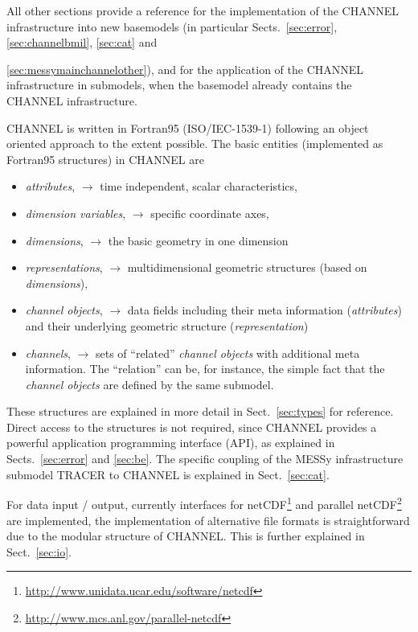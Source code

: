\documentclass[twoside]{article}
\begin{document}
All other sections provide a reference for the
implementation of the CHANNEL infrastructure into new basemodels
(in particular Sects.~\ref{sec:error}, \ref{sec:channelbmil},
\ref{sec:cat} and {\ref{sec:messymainchannelother}),
and for the application of the CHANNEL infrastructure in submodels, when the
basemodel already contains the CHANNEL infrastructure.

CHANNEL is written in Fortran95 (ISO/IEC-1539-1) following an object oriented
approach to the extent possible. The basic entities (implemented as Fortran95
structures) in CHANNEL are
\begin{itemize}
 \item {\it attributes}, $\rightarrow$ time independent, scalar
       characteristics,
 \item {\it dimension variables}, $\rightarrow$ specific coordinate axes,
 \item {\it dimensions}, $\rightarrow$ the basic geometry in one dimension
 \item {\it representations}, $\rightarrow$ multidimensional geometric
       structures (based on {\it dimensions}),
 \item {\it channel objects}, $\rightarrow$ data fields including their meta
       information ({\it attributes}) and their underlying geometric
       structure ({\it representation})
 \item {\it channels}, $\rightarrow$ sets of ``related''
       {\it channel objects} with additional meta information.
       The ``relation'' can be, for instance, the simple fact that the
       {\it channel objects} are defined by the same submodel.
\end{itemize}
%
These structures are explained in more detail in Sect.~\ref{sec:types} for
reference. Direct access to the structures is not required, since
CHANNEL provides a powerful application programming interface (API),
as explained in Sects.~\ref{sec:error} and \ref{sec:be}.
The specific coupling of the MESSy infrastructure submodel TRACER to
CHANNEL is explained in Sect.~\ref{sec:cat}.

For data input / output,
currently interfaces for
netCDF\footnote{\url{http://www.unidata.ucar.edu/software/netcdf}}
and
parallel netCDF\footnote{\url{http://www.mcs.anl.gov/parallel-netcdf}}
are implemented, the implementation of
alternative file formats is straightforward due to the modular
structure of CHANNEL.
This is further explained in Sect.~\ref{sec:io}.

}
\end{document}
